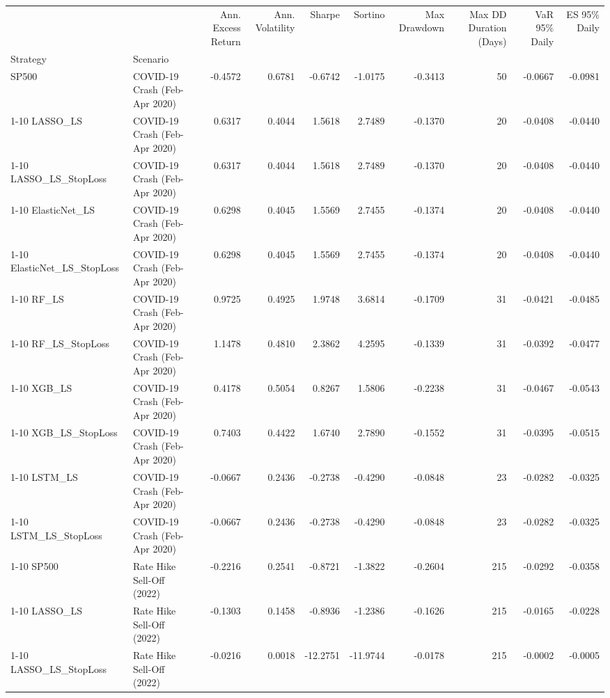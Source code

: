 \begin{tabular}{llrrrrrrrr}
\toprule
 &  & Ann. Excess Return & Ann. Volatility & Sharpe & Sortino & Max Drawdown & Max DD Duration (Days) & VaR 95\% Daily & ES 95\% Daily \\
Strategy & Scenario &  &  &  &  &  &  &  &  \\
\midrule
SP500 & COVID-19 Crash (Feb-Apr 2020) & -0.4572 & 0.6781 & -0.6742 & -1.0175 & -0.3413 & 50 & -0.0667 & -0.0981 \\
\cline{1-10}
LASSO\_LS & COVID-19 Crash (Feb-Apr 2020) & 0.6317 & 0.4044 & 1.5618 & 2.7489 & -0.1370 & 20 & -0.0408 & -0.0440 \\
\cline{1-10}
LASSO\_LS\_StopLoss & COVID-19 Crash (Feb-Apr 2020) & 0.6317 & 0.4044 & 1.5618 & 2.7489 & -0.1370 & 20 & -0.0408 & -0.0440 \\
\cline{1-10}
ElasticNet\_LS & COVID-19 Crash (Feb-Apr 2020) & 0.6298 & 0.4045 & 1.5569 & 2.7455 & -0.1374 & 20 & -0.0408 & -0.0440 \\
\cline{1-10}
ElasticNet\_LS\_StopLoss & COVID-19 Crash (Feb-Apr 2020) & 0.6298 & 0.4045 & 1.5569 & 2.7455 & -0.1374 & 20 & -0.0408 & -0.0440 \\
\cline{1-10}
RF\_LS & COVID-19 Crash (Feb-Apr 2020) & 0.9725 & 0.4925 & 1.9748 & 3.6814 & -0.1709 & 31 & -0.0421 & -0.0485 \\
\cline{1-10}
RF\_LS\_StopLoss & COVID-19 Crash (Feb-Apr 2020) & 1.1478 & 0.4810 & 2.3862 & 4.2595 & -0.1339 & 31 & -0.0392 & -0.0477 \\
\cline{1-10}
XGB\_LS & COVID-19 Crash (Feb-Apr 2020) & 0.4178 & 0.5054 & 0.8267 & 1.5806 & -0.2238 & 31 & -0.0467 & -0.0543 \\
\cline{1-10}
XGB\_LS\_StopLoss & COVID-19 Crash (Feb-Apr 2020) & 0.7403 & 0.4422 & 1.6740 & 2.7890 & -0.1552 & 31 & -0.0395 & -0.0515 \\
\cline{1-10}
LSTM\_LS & COVID-19 Crash (Feb-Apr 2020) & -0.0667 & 0.2436 & -0.2738 & -0.4290 & -0.0848 & 23 & -0.0282 & -0.0325 \\
\cline{1-10}
LSTM\_LS\_StopLoss & COVID-19 Crash (Feb-Apr 2020) & -0.0667 & 0.2436 & -0.2738 & -0.4290 & -0.0848 & 23 & -0.0282 & -0.0325 \\
\cline{1-10}
SP500 & Rate Hike Sell-Off (2022) & -0.2216 & 0.2541 & -0.8721 & -1.3822 & -0.2604 & 215 & -0.0292 & -0.0358 \\
\cline{1-10}
LASSO\_LS & Rate Hike Sell-Off (2022) & -0.1303 & 0.1458 & -0.8936 & -1.2386 & -0.1626 & 215 & -0.0165 & -0.0228 \\
\cline{1-10}
LASSO\_LS\_StopLoss & Rate Hike Sell-Off (2022) & -0.0216 & 0.0018 & -12.2751 & -11.9744 & -0.0178 & 215 & -0.0002 & -0.0005 \\

\end{tabular}

